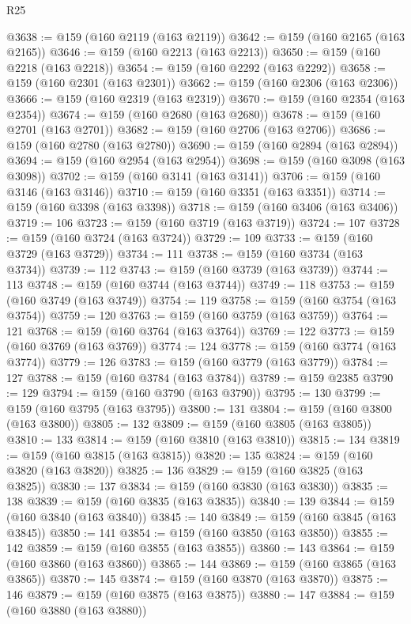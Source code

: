 \begin{lexlean}{R25}
\begin{coremodule}
{{{{{{{{{{{{{{{{{{{{{{{{{{{{{{{{{{{{{{{{{{{{{{{{{{{{{{{{{{{{{{{{{{{{{{{{{{{{{{{{{{{{{{{{{{{{{{{{{{{{{{{{{{{{{{{{{{{{{{{{{{{{{{{{{{{{{{{{{{{{{{{{{{{{{{{{{{{{{{{{{{{{{{{{{{{{{{{{{{{{{{{{{{{{{{{{{{{{{{{@3638 := @159 (@160 @2119 (@163 @2119))
@3642 := @159 (@160 @2165 (@163 @2165))
@3646 := @159 (@160 @2213 (@163 @2213))
@3650 := @159 (@160 @2218 (@163 @2218))
@3654 := @159 (@160 @2292 (@163 @2292))
@3658 := @159 (@160 @2301 (@163 @2301))
@3662 := @159 (@160 @2306 (@163 @2306))
@3666 := @159 (@160 @2319 (@163 @2319))
@3670 := @159 (@160 @2354 (@163 @2354))
@3674 := @159 (@160 @2680 (@163 @2680))
@3678 := @159 (@160 @2701 (@163 @2701))
@3682 := @159 (@160 @2706 (@163 @2706))
@3686 := @159 (@160 @2780 (@163 @2780))
@3690 := @159 (@160 @2894 (@163 @2894))
@3694 := @159 (@160 @2954 (@163 @2954))
@3698 := @159 (@160 @3098 (@163 @3098))
@3702 := @159 (@160 @3141 (@163 @3141))
@3706 := @159 (@160 @3146 (@163 @3146))
@3710 := @159 (@160 @3351 (@163 @3351))
@3714 := @159 (@160 @3398 (@163 @3398))
@3718 := @159 (@160 @3406 (@163 @3406))
@3719 := 106
@3723 := @159 (@160 @3719 (@163 @3719))
@3724 := 107
@3728 := @159 (@160 @3724 (@163 @3724))
@3729 := 109
@3733 := @159 (@160 @3729 (@163 @3729))
@3734 := 111
@3738 := @159 (@160 @3734 (@163 @3734))
@3739 := 112
@3743 := @159 (@160 @3739 (@163 @3739))
@3744 := 113
@3748 := @159 (@160 @3744 (@163 @3744))
@3749 := 118
@3753 := @159 (@160 @3749 (@163 @3749))
@3754 := 119
@3758 := @159 (@160 @3754 (@163 @3754))
@3759 := 120
@3763 := @159 (@160 @3759 (@163 @3759))
@3764 := 121
@3768 := @159 (@160 @3764 (@163 @3764))
@3769 := 122
@3773 := @159 (@160 @3769 (@163 @3769))
@3774 := 124
@3778 := @159 (@160 @3774 (@163 @3774))
@3779 := 126
@3783 := @159 (@160 @3779 (@163 @3779))
@3784 := 127
@3788 := @159 (@160 @3784 (@163 @3784))
@3789 := @159 @2385
@3790 := 129
@3794 := @159 (@160 @3790 (@163 @3790))
@3795 := 130
@3799 := @159 (@160 @3795 (@163 @3795))
@3800 := 131
@3804 := @159 (@160 @3800 (@163 @3800))
@3805 := 132
@3809 := @159 (@160 @3805 (@163 @3805))
@3810 := 133
@3814 := @159 (@160 @3810 (@163 @3810))
@3815 := 134
@3819 := @159 (@160 @3815 (@163 @3815))
@3820 := 135
@3824 := @159 (@160 @3820 (@163 @3820))
@3825 := 136
@3829 := @159 (@160 @3825 (@163 @3825))
@3830 := 137
@3834 := @159 (@160 @3830 (@163 @3830))
@3835 := 138
@3839 := @159 (@160 @3835 (@163 @3835))
@3840 := 139
@3844 := @159 (@160 @3840 (@163 @3840))
@3845 := 140
@3849 := @159 (@160 @3845 (@163 @3845))
@3850 := 141
@3854 := @159 (@160 @3850 (@163 @3850))
@3855 := 142
@3859 := @159 (@160 @3855 (@163 @3855))
@3860 := 143
@3864 := @159 (@160 @3860 (@163 @3860))
@3865 := 144
@3869 := @159 (@160 @3865 (@163 @3865))
@3870 := 145
@3874 := @159 (@160 @3870 (@163 @3870))
@3875 := 146
@3879 := @159 (@160 @3875 (@163 @3875))
@3880 := 147
@3884 := @159 (@160 @3880 (@163 @3880))
}}}}}}}}}}}}}}}}}}}}}}}}}}}}}}}}}}}}}}}}}}}}}}}}}}}}}}}}}}}}}}}}}}}}}}}}}}}}}}}}}}}}}}}}}}}}}}}}}}}}}}}}}}}}}}}}}}}}}}}}}}}}}}}}}}}}}}}}}}}}}}}}}}}}}}}}}}}}}}}}}}}}}}}}}}}}}}}}}}}}}}}}}}}}}}}}}}}}}}}
\end{coremodule}
\end{lexlean}
